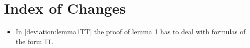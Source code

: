 \section{Index of Changes}
\begin{itemize}
    \item In \ref{deviation:lemma1TT} the proof of lemma 1 has to deal with formulas of the form \texttt{TT}. 
\end{itemize}